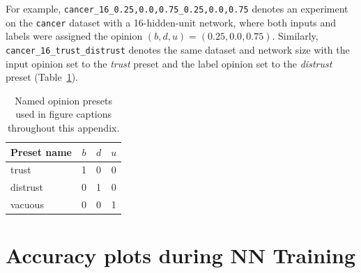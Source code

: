 For example, \texttt{cancer\_16\_0.25,0.0,0.75\_0.25,0.0,0.75} denotes an
experiment on the \texttt{cancer} dataset with a 16-hidden-unit network,
where both inputs and labels were assigned the opinion
$(b,d,u) = (0.25, 0.0, 0.75)$. Similarly,
\texttt{cancer\_16\_trust\_distrust} denotes the same dataset and network
size with the input opinion set to the \emph{trust} preset and the label
opinion set to the \emph{distrust} preset (Table~\ref{tab:opinion-presets}).

\begin{table}[h]
\centering
\caption{Named opinion presets used in figure captions throughout this appendix.}
\label{tab:opinion-presets}
\begin{tabular}{lccc}
\toprule
\textbf{Preset name} & $b$ & $d$ & $u$ \\
\midrule
trust    & 1 & 0 & 0 \\
distrust & 0 & 1 & 0 \\
vacuous  & 0 & 0 & 1 \\
\bottomrule
\end{tabular}
\end{table}

\section{Accuracy plots during \ac{NN} Training}

